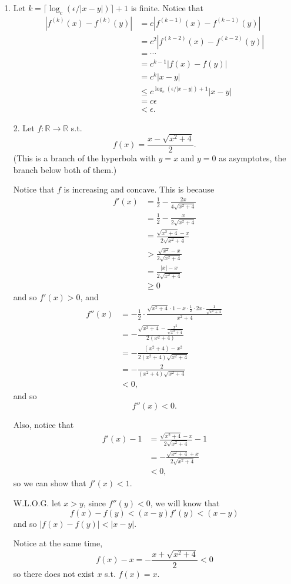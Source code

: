 \documentclass[11pt]{article}
\theoremstyle{definition}
\theoremstyle{remark}
\theoremstyle{problem}
\begin{document}
\begin{enumerate}
    \item Let $k = \lceil\log_c(\epsilon/|x-y|)\rceil + 1$ is finite. Notice that 
   \begin{align*}
   |f^{(k)}(x) - f^{(k)}(y)| &= c|f^{(k-1)}(x) - f^{(k-1)}(y)|\\
   &= c^2|f^{(k-2)}(x) - f^{(k-2)}(y)|\\
   &= \cdots\\
   &= c^{k-1}|f(x) - f(y)|\\
   &= c^k |x - y|\\
   &\leq c^{\log_c(\epsilon/|x-y|)+1} |x-y|\\
   &= c\epsilon\\
   &< \epsilon.
   \end{align*}

2. Let $f: \mathbb{R} \to \mathbb{R}$ s.t.
   $$
   f(x) = \frac{x-\sqrt{x^2+4}}{2}.
   $$
    (This is a branch of the hyperbola with $y=x$ and $y=0$ as asymptotes, the branch below both of them.)

   Notice that $f$ is increasing and concave. This is because
   \begin{align*}
   f'(x) &= \frac{1}{2} - \frac{2x}{4\sqrt{x^2+4}}\\
   &= \frac{1}{2} - \frac{x}{2\sqrt{x^2+4}}\\
   &= \frac{\sqrt{x^2+4}-x}{2\sqrt{x^2+4}}\\
   &> \frac{\sqrt{x^2}-x}{2\sqrt{x^2+4}}\\
   &= \frac{|x|-x}{2\sqrt{x^2+4}}\\
   &\geq 0
   \end{align*}
   and so $f'(x)>0$, and
   \begin{align*}
   	f''(x) &= -\frac{1}{2} \cdot \frac{\sqrt{x^2+4} \cdot 1 - x \cdot \frac{1}{2} \cdot 2x \cdot \frac{1}{\sqrt{x^2+4}}}{x^2+4}\\
   	&= -\frac{\sqrt{x^2+4} - \frac{x^2}{\sqrt{x^2+4}}}{2(x^2+4)}\\
   	&= -\frac{(x^2+4) - x^2}{2(x^2+4)\sqrt{x^2+4}}\\
   	&= -\frac{2}{(x^2+4)\sqrt{x^2+4}}\\
   	&< 0,
   \end{align*}
   and so $$f''(x) < 0.$$

   Also, notice that
   \begin{align*}
   	f'(x) - 1 &= \frac{\sqrt{x^2 + 4} -x }{2\sqrt{x^2 + 4}} - 1\\
   	&= - \frac{\sqrt{x^2 + 4} +x }{2\sqrt{x^2 + 4}}\\
   	&<0,
   \end{align*}
   so we can show that $f'(x) < 1$.

   W.L.O.G. let $x > y$, since $f''(y) < 0$, we will know that
   $$
   f(x) - f(y) < (x - y)f'(y) < (x-y)
   $$
   and so $|f(x) - f(y)| < |x-y|$.

   Notice at the same time,
   $$
   f(x) - x = -\frac{x+\sqrt{x^2+4}}{2} < 0
   $$
   so there does not exist $x$ s.t. $f(x) = x$.
\end{enumerate}
\newpage
\end{document}
